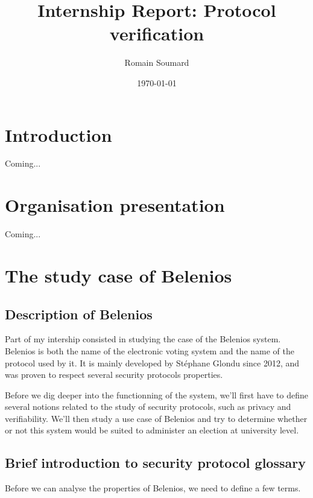 \documentclass[12pt, a4paper]{report}
\title{\color{blue}Internship Report: Protocol verification}
\author{Romain Soumard}
\date{\today}
\begin{document}
\maketitle

\section{Introduction}

Coming...

\section{Organisation presentation}

Coming...

\section{The study case of Belenios}

\subsection{Description of Belenios}

Part of my intership consisted in studying the case of the Belenios system.
Belenios is both the name of the electronic voting system and the name of the protocol used by it.
It is mainly developed by Stéphane Glondu since 2012, and was proven to respect several security protocols properties.

Before we dig deeper into the functionning of the system, we'll first have to define several notions related to the study of security protocols, such as privacy and verifiability.
We'll then study a use case of Belenios and try to determine whether or not this system would be suited to administer an election at university level.

\subsection{Brief introduction to security protocol glossary}

Before we can analyse the properties of Belenios, we need to define a few terms.
\end{document}
